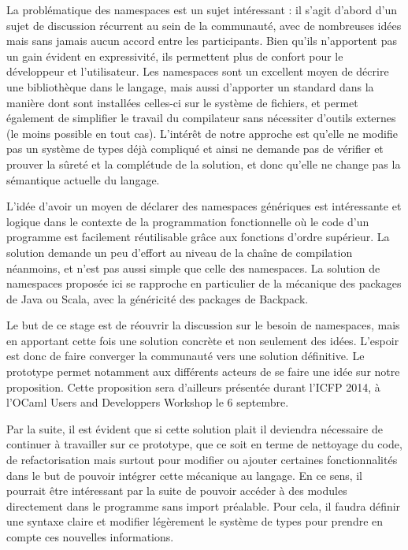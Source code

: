 \documentclass[11pt,a4paper]{report}
\begin{document}
La problématique des namespaces est un sujet intéressant : il s'agit d'abord
d'un sujet de discussion récurrent au sein de la communauté, avec de nombreuses
idées mais sans jamais aucun accord entre les participants. Bien qu'ils n'apportent
pas un gain évident en expressivité, ils permettent plus de confort pour le
développeur et l'utilisateur. Les namespaces sont un excellent moyen de décrire
une bibliothèque dans le langage, mais aussi d'apporter un standard dans la
manière dont sont installées celles-ci sur le système de fichiers, et permet
également de simplifier le travail du compilateur sans nécessiter d'outils
externes (le moins possible en tout cas). L'intérêt de notre approche est
qu'elle ne modifie pas un système de types déjà compliqué et ainsi ne demande
pas de vérifier et prouver la sûreté et la complétude de la solution, et donc
qu'elle ne change pas la sémantique actuelle du langage.

L'idée d'avoir un moyen de déclarer des namespaces génériques est intéressante
et logique dans le contexte de la programmation fonctionnelle où le code d'un
programme est facilement réutilisable grâce aux fonctions d'ordre supérieur. La
solution demande un peu d'effort au niveau de la chaîne de compilation
néanmoins, et n'est pas aussi simple que celle des namespaces. La solution de
namespaces proposée ici se rapproche en particulier de la mécanique des packages
de Java ou Scala, avec la généricité des packages de Backpack.

Le but de ce stage est de réouvrir la discussion sur le besoin de namespaces,
mais en apportant cette fois une solution concrète et non seulement des
idées. L'espoir est donc de faire converger la communauté vers une solution
définitive. Le prototype permet notamment aux différents acteurs de se faire une
idée sur notre proposition. Cette proposition sera d'ailleurs présentée durant
l'ICFP 2014, à l'OCaml Users and Developpers Workshop le 6 septembre.

Par la suite, il est évident que si cette solution plait il deviendra nécessaire
de continuer à travailler sur ce prototype, que ce soit en terme de nettoyage du
code, de refactorisation mais surtout pour modifier ou ajouter certaines
fonctionnalités dans le but de pouvoir intégrer cette mécanique au langage. En
ce sens, il pourrait être intéressant par la suite de pouvoir accéder à des
modules directement dans le programme sans import préalable. Pour cela, il
faudra définir une syntaxe claire et modifier légèrement le système de types
pour prendre en compte ces nouvelles informations.
\end{document}
